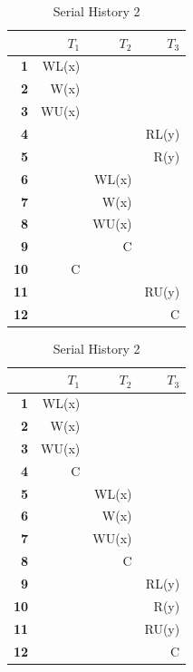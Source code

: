 \documentclass[12pt, letterpaper]{report}
\begin{document}
\begin{table}[H]
	\centering
	\setlength\tabcolsep{4pt}
	\begin{minipage}{0.48\textwidth}
		\centering
		\begin{tabular}{ |r|r|r|r| }
			\hline
			& \textbf{$T_1$} & \textbf{$T_2$} & \textbf{$T_3$} \\
			\hline
			\textbf{1} & WL(x) & & \\
			\hline
			\textbf{2} & W(x) & & \\
			\hline
			\textbf{3} & WU(x) & & \\
			\hline
			\textbf{4} & & & RL(y) \\
			\hline
			\textbf{5} & & & R(y) \\
			\hline
			\textbf{6} & & WL(x) & \\
			\hline
			\textbf{7} & & W(x) & \\
			\hline
			\textbf{8} & & WU(x) & \\
			\hline
			\textbf{9} & & C & \\
			\hline
			\textbf{10} & C & & \\
			\hline
			\textbf{11} & & & RU(y) \\
			\hline
			\textbf{12} & & & C \\
			\hline
		\end{tabular}
		\caption{Concurrent History 2}
	\end{minipage}
	\hfill
	\begin{minipage}{0.48\textwidth}
		\centering
		\begin{tabular}{ |r|r|r|r| }
			\hline
			& \textbf{$T_1$} & \textbf{$T_2$} & \textbf{$T_3$} \\
			\hline
			\textbf{1} & WL(x) & & \\
			\hline
			\textbf{2} & W(x) & & \\
			\hline
			\textbf{3} & WU(x) & & \\
			\hline
			\textbf{4} & C & & \\
			\hline
			\textbf{5} & & WL(x) & \\
			\hline
			\textbf{6} & & W(x) & \\
			\hline
			\textbf{7} & & WU(x) & \\
			\hline
			\textbf{8} & & C & \\
			\hline
			\textbf{9} & & & RL(y) \\
			\hline
			\textbf{10} & & & R(y) \\
			\hline
			\textbf{11} & & & RU(y) \\
			\hline
			\textbf{12} & & & C \\
			\hline
		\end{tabular}
		\caption{Serial History 2}
	\end{minipage}
\end{table}
\end{document}
